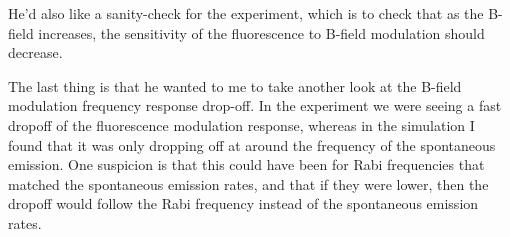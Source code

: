 \documentclass[11pt]{article}
\begin{document}
He'd also like a sanity-check for the experiment, which is to check
that as the B-field increases, the sensitivity of the fluorescence to
B-field modulation should decrease.

The last thing is that he wanted to me to take another look at the
B-field modulation frequency response drop-off. In the experiment we
were seeing a fast dropoff of the fluorescence modulation response,
whereas in the simulation I found that it was only dropping off at
around the frequency of the spontaneous emission. One suspicion is
that this could have been for Rabi frequencies that matched the
spontaneous emission rates, and that if they were lower, then the
dropoff would follow the Rabi frequency instead of the spontaneous
emission rates.
\end{document}
